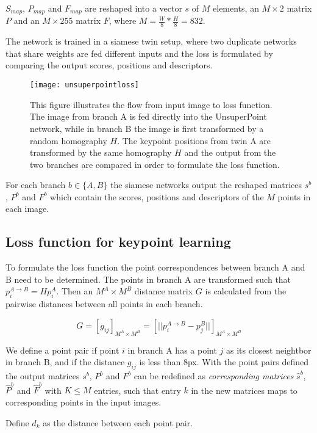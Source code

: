 $S_{map}$, $P_{map}$ and $F_{map}$ are reshaped into a vector $s$ of $M$ elements, an $M\times 2$ matrix $P$ and an $M\times 255$ matrix $F$, where $M=\frac{W}{8}*\frac{H}{8}=832$.

The network is trained in a siamese twin setup, where two duplicate networks that share weights are fed different inputs and the loss is formulated by comparing the output scores, positions and descriptors.

\begin{figure}[H]
	\centering
	\texttt{[image: unsuperpointloss]}
	\caption{This figure illustrates the flow from input image to loss function. The image from branch A is fed directly into the UnsuperPoint network, while in branch B the image is first transformed by a random homography $H$. The keypoint positions from twin A are transformed by the same homography $H$ and the output from the two branches are compared in order to formulate the loss function.}
	\label{fig:unsuperpointloss}
\end{figure}

For each branch $b\in\{A,B\}$ the siamese networks output the reshaped matrices $s^b$, $P^b$ and $F^b$ which contain the scores, positions and descriptors of the $M$ points in each image.

\subsection{Loss function for keypoint learning}\label{sec:keypointloss}

To formulate the loss function the point correspondences between branch A and B need to be determined. The points in branch A are transformed such that $p_i^{A\rightarrow B}=Hp_i^A$. Then an $M^A\times M^B$ distance matrix $G$ is calculated from the pairwise distances between all points in each branch.

\[
G=[g_{ij}]_{M^A\times M^B}=\left[||p_i^{A\rightarrow B}-p_j^B||\right]_{M^A\times M^B}
\]

We define a point pair if point $i$ in branch A has a point $j$ as its closest neightbor in branch B, and if the distance $g_{ij}$ is less than 8px. With the point pairs defined the output matrices $s^b$, $P^b$ and $F^b$ can be redefined as \textit{corresponding matrices} $\hat{s}^b$, $\hat{P}^b$ and $\hat{F}^b$ with $K\le M$ entries, such that entry $k$ in the new matrices maps to corresponding points in the input images.

Define $d_k$ as the distance between each point pair.


